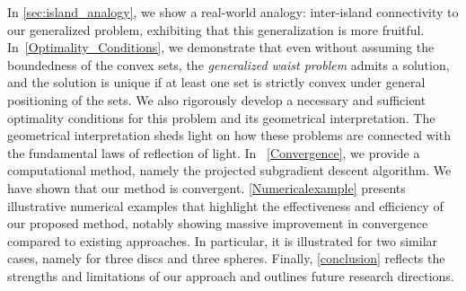 \documentclass[12pt]{article}
\theoremstyle{plain}
\theoremstyle{definition}
\begin{document}
In \ref{sec:island_analogy}, we show a real-world analogy: inter-island connectivity to our generalized problem, exhibiting that this generalization is more fruitful. In~\ref{Optimality_Conditions}, we demonstrate that even without assuming the boundedness of the convex sets, the \textit{ generalized waist problem} admits a solution, and the solution is unique if at least one set is strictly convex under general positioning of the sets. We also rigorously develop a necessary and sufficient optimality conditions for this problem and its geometrical interpretation. The geometrical interpretation sheds light on how these problems are connected with the fundamental laws of reflection of light. 
In~ \ref{Convergence}, we provide a computational method, namely the projected subgradient descent algorithm. We have shown that our method is convergent. \ref{Numericalexample} presents illustrative numerical examples that highlight the effectiveness and efficiency of our proposed method, notably showing massive improvement in convergence compared to existing approaches. In particular, it is illustrated for two similar cases, namely for  three discs and three spheres. Finally, \ref{conclusion} reflects the strengths and limitations of our approach and outlines future research directions.
\end{document}
